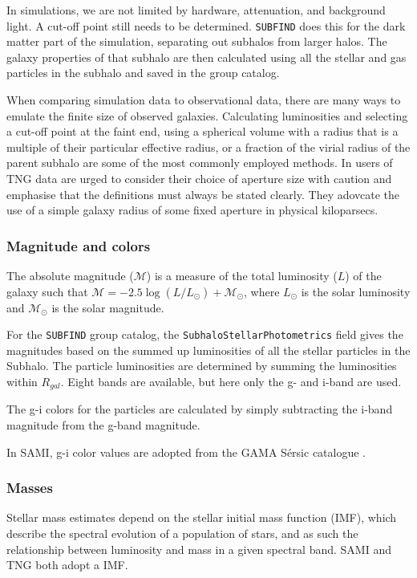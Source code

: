 In simulations, we are not limited by hardware, attenuation, and background light. A cut-off point still needs to be determined. \texttt{SUBFIND} does this for the dark matter part of the simulation, separating out subhalos from larger halos. The galaxy properties of that subhalo are then calculated using all the stellar and gas particles in the subhalo and saved in the group catalog. 

When comparing simulation data to observational data, there are many ways to emulate the finite size of observed galaxies. Calculating luminosities and selecting a cut-off point at the faint end, using a spherical volume with a radius that is a multiple of their particular effective radius, or a fraction of the virial radius of the parent subhalo are some of the most commonly employed methods. In \textcite{Pillepich2017} users of TNG data are urged to consider their choice of aperture size with caution and emphasise that the definitions must always be stated clearly. They adovcate the use of a simple galaxy radius of some fixed aperture in physical kiloparsecs.

\subsubsection{Magnitude and colors}

The absolute magnitude ($\mathcal{M}$) is a measure of the total luminosity ($L$) of the galaxy such that $\mathcal{M} = -2.5 \log(L/L_\odot) + \mathcal{M}_\odot$, where $L_\odot$ is the solar luminosity and $\mathcal{M}_\odot$ is the solar magnitude.

For the \texttt{SUBFIND} group catalog, the \texttt{SubhaloStellarPhotometrics} field gives the magnitudes based on the summed up luminosities of all the stellar particles in the Subhalo. The particle luminosities are determined by summing the luminosities within $R_{gal}$. Eight bands are available, but here only the g- and i-band are used. 

The g-i colors for the particles are calculated by simply subtracting the i-band magnitude from the g-band magnitude.

In SAMI, g-i color values are adopted from the GAMA Sérsic catalogue \parencite{Driver2011}.

\subsubsection{Masses}

Stellar mass estimates depend on the stellar initial mass function (IMF), which describe the spectral evolution of a population of stars, and as such the relationship between luminosity and mass in a given spectral band. SAMI and TNG both adopt a \textcite{Chabrier2003} IMF.

